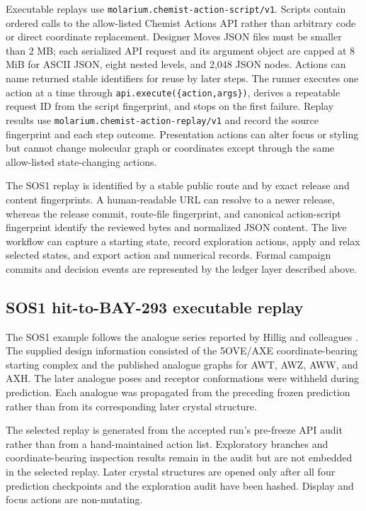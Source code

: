 \documentclass[11pt]{article}
\begin{document}
\begin{small}
Executable replays use \texttt{molarium.chemist-action-script/v1}. Scripts contain ordered calls to the allow-listed Chemist Actions API rather than arbitrary code or direct coordinate replacement. Designer Moves JSON files must be smaller than 2 MB; each serialized API request and its argument object are capped at 8 MiB for ASCII JSON, eight nested levels, and 2,048 JSON nodes. Actions can name returned stable identifiers for reuse by later steps. The runner executes one action at a time through \texttt{api.execute(\{action,args\})}, derives a repeatable request ID from the script fingerprint, and stops on the first failure. Replay results use \texttt{molarium.chemist-action-replay/v1} and record the source fingerprint and each step outcome. Presentation actions can alter focus or styling but cannot change molecular graph or coordinates except through the same allow-listed state-changing actions.

The SOS1 replay is identified by a stable public route and by exact release and content fingerprints. A human-readable URL can resolve to a newer release, whereas the release commit, route-file fingerprint, and canonical action-script fingerprint identify the reviewed bytes and normalized JSON content. The live workflow can capture a starting state, record exploration actions, apply and relax selected states, and export action and numerical records. Formal campaign commits and decision events are represented by the ledger layer described above.

\subsection{SOS1 hit-to-BAY-293 executable replay}

The SOS1 example follows the analogue series reported by Hillig and colleagues \citep{hillig2019sos1}. The supplied design information consisted of the 5OVE/AXE coordinate-bearing starting complex and the published analogue graphs for AWT, AWZ, AWW, and AXH. The later analogue poses and receptor conformations were withheld during prediction. Each analogue was propagated from the preceding frozen prediction rather than from its corresponding later crystal structure.

The selected replay is generated from the accepted run's pre-freeze API audit rather than from a hand-maintained action list. Exploratory branches and coordinate-bearing inspection results remain in the audit but are not embedded in the selected replay. Later crystal structures are opened only after all four prediction checkpoints and the exploration audit have been hashed. Display and focus actions are non-mutating.


\end{small}
\end{document}
